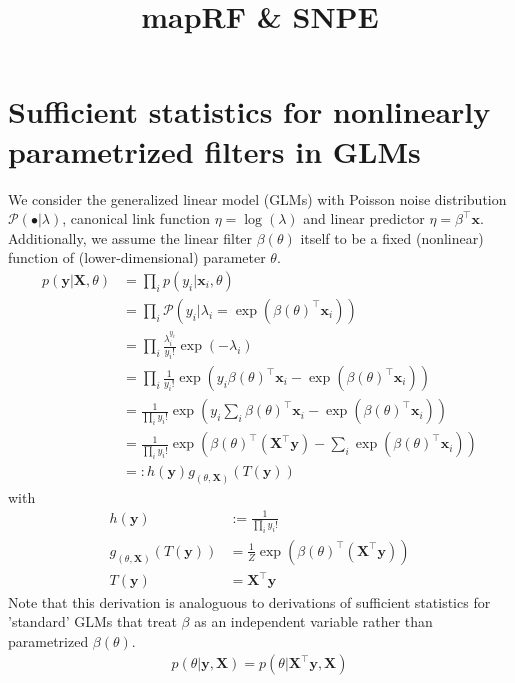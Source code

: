 \documentclass[10pt,english]{article}
\title{mapRF \& SNPE}
\author{}
\date{}
\newcommand{\yb}{\mathbf{y}}
\newcommand{\xb}{\mathbf{x}}
\newcommand{\Xb}{\mathbf{X}}
\begin{document}
\maketitle

\section{Sufficient statistics for nonlinearly parametrized filters in GLMs}
\label{seq:published_SVI}

We consider the generalized linear model (GLMs) with Poisson noise distribution $\mathcal{P}(\bullet|\lambda)$, canonical link function $\eta= \log(\lambda)$ and linear predictor $\eta = \beta^\top \xb$. 
Additionally, we assume the linear filter $\beta(\theta)$ itself to be a fixed (nonlinear) function of (lower-dimensional) parameter $\theta$. 
\begin{align}
p(\yb | \Xb, \theta) &= \prod_i p(y_i | \xb_i, \theta) \nonumber \\
&= \prod_i \mathcal{P}\left(y_i | \lambda_i = \exp(\beta(\theta)^\top \xb_i) \right) \nonumber \\
&= \prod_i  \frac{\lambda_i^{y_i}}{y_i!} \exp(-\lambda_i) \nonumber \\
&= \prod_i \frac{1}{y_i!} \exp\left( y_i \beta(\theta)^\top \xb_i - \exp(\beta(\theta)^\top \xb_i) \right) \nonumber \\
&= \frac{1}{\prod_i y_i!} \exp\left( y_i \sum_i \beta(\theta)^\top \xb_i - \exp(\beta(\theta)^\top \xb_i) \right) \nonumber \\
&= \frac{1}{\prod_i y_i!} \exp\left( \beta(\theta)^\top \left(\Xb^\top \yb \right) - \sum_i  \exp(\beta(\theta)^\top \xb_i) \right) \nonumber \\
&=: h(\yb) g_{(\theta, \Xb)}(T(\yb)) \nonumber
\end{align}
with 
\begin{align}
h(\yb) &:= \frac{1}{\prod_i y_i!} \nonumber \\
g_{(\theta, \Xb)}(T(\yb)) &= \frac{1}{Z} \exp\left( \beta(\theta)^\top \left(\Xb^\top \yb \right) \right) \nonumber \\
T(\yb) &= \Xb^\top \yb \nonumber 
\end{align}
Note that this derivation is analoguous to derivations of sufficient statistics for 'standard' GLMs that treat $\beta$ as an independent variable rather than parametrized $\beta(\theta)$.
\begin{align}
p(\theta | \yb, \Xb) = p(\theta | \Xb^\top\yb, \Xb)
\end{align}
\end{document}
